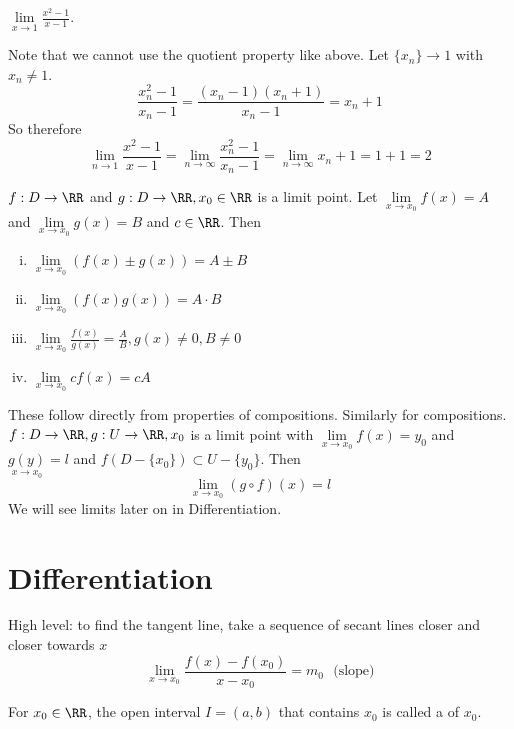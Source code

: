 \documentclass[12pt]{scrartcl}
\begin{document}
\begin{example}
  $\underset{x\to1}{\lim}\frac{x^2-1}{x-1}$. 

  Note that we cannot use the quotient property like above. Let $\{x_n\} \to 1$ with 
  $x_n \neq 1$. 
  \[\frac{x_n^2 - 1}{x_n - 1} = \frac{(x_n-1)(x_n+1)}{x_n-1} = x_n + 1\]
  So therefore
  \[\lim_{n\to1} \frac{x^2-1}{x-1} = \lim_{n\to\infty}\frac{x_n^2-1}{x_n-1} = \lim_{n\to\infty}x_n + 1 = 1 + 1 = 2\]
\end{example}

\begin{theorem}
  $f: D \to \RR$ and $g: D \to \RR, x_0 \in\RR$ is a limit point. 
  Let $\underset{x\to x_0}{\lim}f(x) = A$ and $\underset{x\to x_0}{\lim}g(x) = B$
  and $c \in \RR$. Then 
  \begin{enumerate}[i.]
    \item $\underset{x\to x_0}{\lim}(f(x) \pm g(x)) = A \pm B$
    \item $\underset{x\to x_0}{\lim}(f(x)g(x)) = A \cdot B$
    \item $\underset{x\to x_0}{\lim}\frac{f(x)}{g(x)} = \frac{A}{B}, g(x) \neq 0, B \neq 0$
    \item $\underset{x\to x_0}{\lim}cf(x) = cA$
  \end{enumerate}
  These follow directly from properties of compositions. Similarly for compositions.
  $f: D \to \RR, g: U \to \RR, x_0$ is a limit point with $\underset{x\to x_0}{\lim}f(x) = y_0$
  and $\underset{x\to x_0}{g(y)} = l$ and $f(D - \{x_0\}) \subset U - \{y_0\}$. 
  Then
  \[\lim_{x\to x_0} (g \circ f)(x) = l\]
  We will see limits later on in Differentiation.
\end{theorem}

\section{Differentiation}

\begin{remark}
  High level: to find the tangent line, take a sequence of secant lines closer and 
  closer towards $x$
  \[\lim_{x\to x_0}\frac{f(x) - f(x_0)}{x - x_0} = m_0 \ \ \ \text{(slope)}\]
\end{remark}

\begin{definition}
  For $x_0 \in \RR$, the open interval $I = (a, b)$  that contains $x_0$ 
  is called a  of $x_0$. 
\end{definition}
\end{document}
